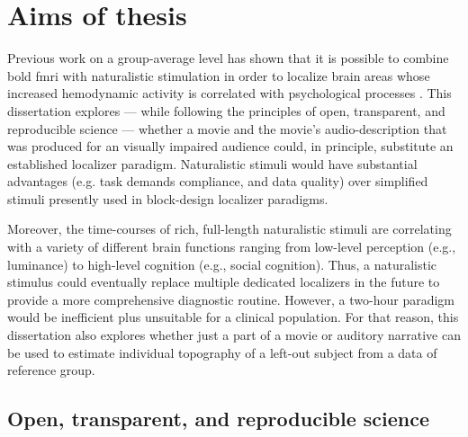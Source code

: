 

\section{Aims of thesis}



%
Previous work on a group-average level has shown that it is possible to combine
\ac{bold} \ac{fmri} with naturalistic stimulation in order to localize brain
areas whose increased hemodynamic activity is correlated with psychological
processes \citep{bartels2004mapping}.
%
This dissertation explores --- while following the principles of open,
transparent, and reproducible science --- whether a movie and the movie's
audio-description that was produced for an visually impaired audience could, in
principle, substitute an established localizer paradigm.
%
Naturalistic stimuli would have substantial advantages (e.g. task demands
compliance, and data quality) over simplified stimuli presently used in
block-design localizer paradigms.


%
Moreover, the time-courses of rich, full-length naturalistic stimuli are
correlating with a variety of different brain functions ranging from low-level
perception (e.g., luminance) to high-level cognition (e.g., social cognition).
%
Thus, a naturalistic stimulus could eventually replace multiple dedicated
localizers in the future to provide a more comprehensive diagnostic routine.
%
However, a two-hour paradigm would be inefficient plus unsuitable for a clinical
population.
%
For that reason, this dissertation also explores whether just a part of a movie
or auditory narrative can be used to estimate individual topography of a
left-out subject from a data of reference group.


\subsection{Open, transparent, and reproducible science}

